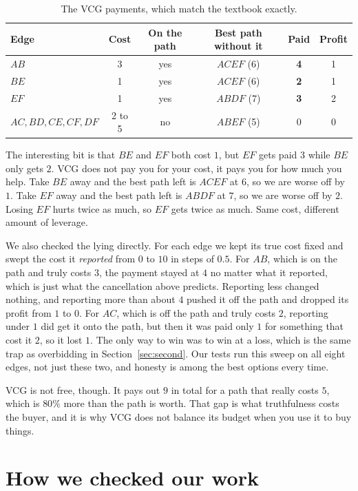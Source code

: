 \documentclass[10pt,a4paper]{article}
\begin{document}
\begin{table}[h]
\centering
\small
\begin{tabular}{lccccc}
\toprule
Edge & Cost & On the path & Best path without it & Paid & Profit \\
\midrule
$AB$ & 3 & yes & $ACEF$ (6) & \textbf{4} & 1 \\
$BE$ & 1 & yes & $ACEF$ (6) & \textbf{2} & 1 \\
$EF$ & 1 & yes & $ABDF$ (7) & \textbf{3} & 2 \\
$AC, BD, CE, CF, DF$ & 2 to 5 & no & $ABEF$ (5) & 0 & 0 \\
\bottomrule
\end{tabular}
\caption{The VCG payments, which match the textbook exactly.}
\end{table}

The interesting bit is that $BE$ and $EF$ both cost $1$, but $EF$ gets paid $3$ while $BE$
only gets $2$. VCG does not pay you for your cost, it pays you for how much you help. Take
$BE$ away and the best path left is $ACEF$ at $6$, so we are worse off by $1$. Take $EF$
away and the best path left is $ABDF$ at $7$, so we are worse off by $2$. Losing $EF$ hurts
twice as much, so $EF$ gets twice as much. Same cost, different amount of leverage.

We also checked the lying directly. For each edge we kept its true cost fixed and swept the
cost it \emph{reported} from $0$ to $10$ in steps of $0.5$. For $AB$, which is on the path
and truly costs $3$, the payment stayed at $4$ no matter what it reported, which is just
what the cancellation above predicts. Reporting less changed nothing, and reporting more
than about $4$ pushed it off the path and dropped its profit from $1$ to $0$. For $AC$,
which is off the path and truly costs $2$, reporting under $1$ did get it onto the path,
but then it was paid only $1$ for something that cost it $2$, so it lost $1$. The only way
to win was to win at a loss, which is the same trap as overbidding in
Section~\ref{sec:second}. Our tests run this sweep on all eight edges, not just these two,
and honesty is among the best options every time.

VCG is not free, though. It pays out $9$ in total for a path that really costs $5$, which is
$80\%$ more than the path is worth. That gap is what truthfulness costs the buyer, and it
is why VCG does not balance its budget when you use it to buy things.

\section{How we checked our work}
\end{document}
